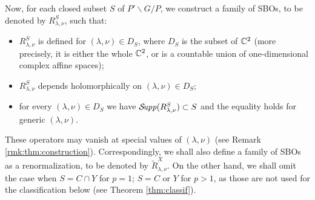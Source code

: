 \documentclass[reqno,12pt]{pja00} %
\newcommand{\Supp}{\mathcal{S}\!{\it upp}}
\theoremstyle{definition}
\theoremstyle{exampstyle} \newtheorem{examp}[theorem]{Theorem}
\begin{document}
Now, for each closed subset $S$ of $P'\backslash G/P$, we construct a family of SBOs, to be denoted by $R^S_{\lambda,\nu}$, such that:
\begin{itemize}
	\item $R_{\lambda,\nu}^S$ is defined for $(\lambda,\nu)\in D_S$, where $D_S$ is the subset of $\mathbb{C}^2$ (more precisely, it is either the whole $\mathbb{C}^2$, or is a countable
		union of one-dimensional complex affine spaces);
	\item $R_{\lambda,\nu}^S$ depends holomorphically on $(\lambda,\nu)\in D_S$;
	\item for every $(\lambda,\nu)\in D_S$ we have $\Supp(R_{\lambda,\nu}^S)\subset S$ and the equality holds for generic $(\lambda,\nu)$.
\end{itemize}
These operators may vanish at special values of $(\lambda,\nu)$ (see Remark \ref{rmk:thm:construction}). Correspondingly, we shall also define
a family of SBOs as a renormalization, to be denoted by $\tilde{R}^X_{\lambda,\nu}$. On the other hand, we shall omit the case when $S=C\cap Y$ for $p=1$;
$S=C$ or $Y$ for $p>1$, as those are not used for the classification below (see Theorem \ref{thm:classif}).
\end{document}
